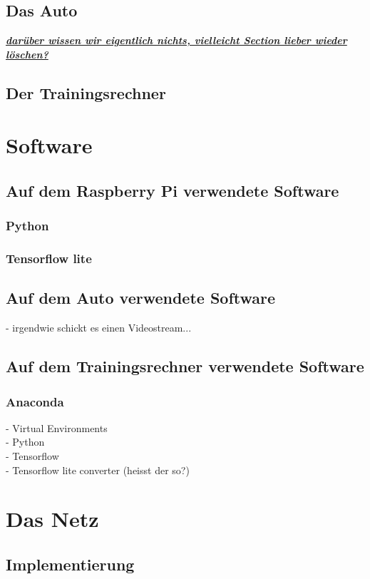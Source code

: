 \documentclass[a4paper, 12pt]{scrartcl}
\begin{document}
		
		\subsection{Das Auto}
		\textbf{\textit{\underline{darüber wissen wir eigentlich nichts, vielleicht Section lieber wieder löschen?}}}
		\subsection{Der Trainingsrechner}
		
	
	\section{Software}
		\subsection{Auf dem Raspberry Pi verwendete Software}
			\subsubsection{Python}
			\subsubsection{Tensorflow lite}
		\subsection{Auf dem Auto verwendete Software}
		- irgendwie schickt es einen Videostream...
		\subsection{Auf dem Trainingsrechner verwendete Software}
			\subsubsection{Anaconda}
			- Virtual Environments \\
			- Python \\
			- Tensorflow \\
			- Tensorflow lite converter (heisst der so?) \\
			
		\section{Das Netz}
			\subsection{Implementierung}
\end{document}
